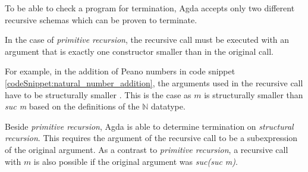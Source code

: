 To be able to check a program for termination, Agda accepts only two different recursive schemas which can be proven to terminate.

In the case of \emph{primitive recursion}, the recursive call must be executed with an argument that is exactly one constructor smaller than in the original call.

For example, in the addition of Peano numbers in code snippet \ref{codeSnippet:natural_number_addition}, the arguments used in the recursive call have to be structurally smaller \cite{norell:deptyped}. 
This is the case as $m$ is structurally smaller than \emph{suc m} based on the definitions of the $\mathbb{N}$ datatype.

Beside \emph{primitive recursion}, Agda is able to determine termination on \emph{structural recursion}.
This requires the argument of the recursive call to be a subexpression of the original argument.
As a contrast to \emph{primitive recursion}, a recursive call with $m$ is also possible if the original argument was \emph{suc(suc m)}.
